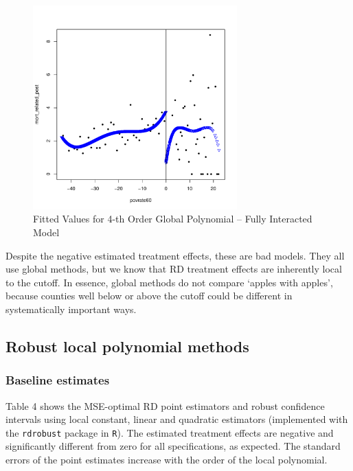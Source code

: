 \documentclass[12pt]{article}
\begin{document}
\begin{figure}[htpb!]
    \centering
    \caption{Fitted Values for 4-th Order Global Polynomial -- Fully Interacted Model}
        \includegraphics[width=0.7\textwidth]{q2-2-full.pdf}
\end{figure}

Despite the negative estimated treatment effects, these are bad models. They all use global methods, but we know that RD treatment effects are inherently local to the cutoff. In essence, global methods do not compare `apples with apples', because counties well below or above the cutoff could be different in systematically important ways.

\subsection{Robust local polynomial methods}

\subsubsection{Baseline estimates}
Table 4 shows the MSE-optimal RD point estimators and robust confidence intervals using local constant, linear and quadratic estimators (implemented with the \verb|rdrobust| package in \verb|R|). The estimated treatment effects are negative and significantly different from zero for all specifications, as expected. The standard errors of the point estimates increase with the order of the local polynomial.
\end{document}
